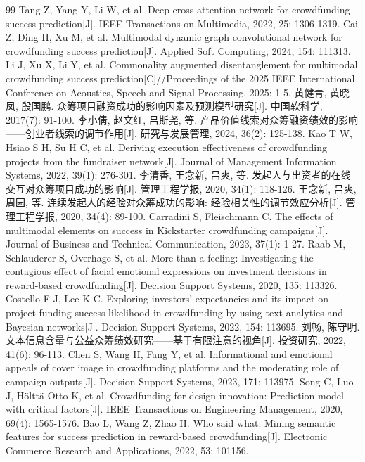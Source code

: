 \begin{thebibliography}{99}
 Tang Z, Yang Y, Li W, et al. Deep cross-attention network for crowdfunding success prediction[J]. IEEE Transactions on Multimedia, 2022, 25: 1306-1319.
 Cai Z, Ding H, Xu M, et al. Multimodal dynamic graph convolutional network for crowdfunding success prediction[J]. Applied Soft Computing, 2024, 154: 111313.
 Li J, Xu X, Li Y, et al. Commonality augmented disentanglement for multimodal crowdfunding success prediction[C]//Proceedings of the 2025 IEEE International Conference on Acoustics, Speech and Signal Processing. 2025: 1-5.
 黄健青, 黄晓凤, 殷国鹏. 众筹项目融资成功的影响因素及预测模型研究[J]. 中国软科学, 2017(7): 91-100.
 李小倩, 赵文红, 吕斯尧, 等. 产品价值线索对众筹融资绩效的影响——创业者线索的调节作用[J]. 研究与发展管理, 2024, 36(2): 125-138.
 Kao T W, Hsiao S H, Su H C, et al. Deriving execution effectiveness of crowdfunding projects from the fundraiser network[J]. Journal of Management Information Systems, 2022, 39(1): 276-301.
 李清香, 王念新, 吕爽, 等. 发起人与出资者的在线交互对众筹项目成功的影响[J]. 管理工程学报, 2020, 34(1): 118-126.
 王念新, 吕爽, 周园, 等. 连续发起人的经验对众筹成功的影响: 经验相关性的调节效应分析[J]. 管理工程学报, 2020, 34(4): 89-100.
 Carradini S, Fleischmann C. The effects of multimodal elements on success in Kickstarter crowdfunding campaigns[J]. Journal of Business and Technical Communication, 2023, 37(1): 1-27.
 Raab M, Schlauderer S, Overhage S, et al. More than a feeling: Investigating the contagious effect of facial emotional expressions on investment decisions in reward-based crowdfunding[J]. Decision Support Systems, 2020, 135: 113326.
 Costello F J, Lee K C. Exploring investors' expectancies and its impact on project funding success likelihood in crowdfunding by using text analytics and Bayesian networks[J]. Decision Support Systems, 2022, 154: 113695.
 刘畅, 陈守明. 文本信息含量与公益众筹绩效研究——基于有限注意的视角[J]. 投资研究, 2022, 41(6): 96-113.
 Chen S, Wang H, Fang Y, et al. Informational and emotional appeals of cover image in crowdfunding platforms and the moderating role of campaign outputs[J]. Decision Support Systems, 2023, 171: 113975.
 Song C, Luo J, H\"oltt\"a-Otto K, et al. Crowdfunding for design innovation: Prediction model with critical factors[J]. IEEE Transactions on Engineering Management, 2020, 69(4): 1565-1576.
 Bao L, Wang Z, Zhao H. Who said what: Mining semantic features for success prediction in reward-based crowdfunding[J]. Electronic Commerce Research and Applications, 2022, 53: 101156.

\end{thebibliography}
